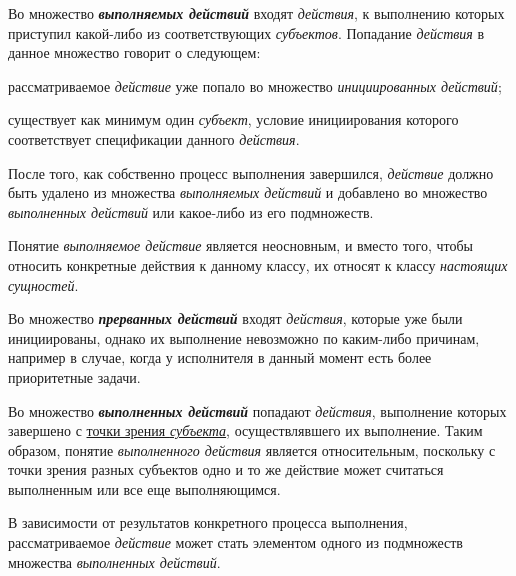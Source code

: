 \begin{frame}{}
\justifying
\vspace{10mm}

Во множество \textbf{\textit{выполняемых действий}} входят \textit{действия}, к выполнению которых приступил какой-либо из соответствующих \textit{субъектов}.
Попадание \textit{действия} в данное множество говорит о следующем:
\begin{textitemize}
	\item рассматриваемое \textit{действие} уже попало во множество \textit{инициированных действий};
	\item существует как минимум один \textit{субъект}, условие инициирования которого соответствует спецификации данного \textit{действия}.
\end{textitemize}

После того, как собственно процесс выполнения завершился, \textit{действие} должно быть удалено из множества \textit{выполняемых действий} и добавлено во множество \textit{выполненных действий} или какое-либо из его подмножеств.

Понятие \textit{выполняемое действие} является неосновным, и вместо того, чтобы относить конкретные действия к данному классу, их относят к классу \textit{настоящих сущностей}.
\end{frame}

\begin{frame}{}
\justifying
\vspace{10mm}
	
Во множество \textbf{\textit{прерванных действий}} входят \textit{действия}, которые уже были инициированы, однако их выполнение невозможно по каким-либо причинам, например в случае, когда у исполнителя в данный момент есть более приоритетные задачи.

\bigskip

Во множество \textbf{\textit{выполненных действий}} попадают \textit{действия}, выполнение которых завершено с \uline{точки зрения \textit{субъекта}}, осуществлявшего их выполнение. Таким образом, понятие \textit{выполненного действия} является относительным, поскольку с точки зрения разных субъектов одно и то же действие может считаться выполненным или все еще выполняющимся.

В зависимости от результатов конкретного процесса выполнения, рассматриваемое \textit{действие} может стать элементом одного из подмножеств множества \textit{выполненных действий}.
\end{frame}

